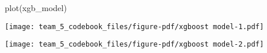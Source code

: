 \documentclass[
  letterpaper,
  DIV=11,
  numbers=noendperiod]{scrartcl}
\newenvironment{Shaded}{\begin{snugshade}}{\end{snugshade}}
\newcommand{\AttributeTok}[1]{\textcolor[rgb]{0.40,0.45,0.13}{#1}}
\newcommand{\CommentTok}[1]{\textcolor[rgb]{0.37,0.37,0.37}{#1}}
\newcommand{\FunctionTok}[1]{\textcolor[rgb]{0.28,0.35,0.67}{#1}}
\newcommand{\NormalTok}[1]{\textcolor[rgb]{0.00,0.23,0.31}{#1}}
\newcommand{\OtherTok}[1]{\textcolor[rgb]{0.00,0.23,0.31}{#1}}
\newcommand{\SpecialCharTok}[1]{\textcolor[rgb]{0.37,0.37,0.37}{#1}}
\begin{document}
\begin{Shaded}
\begin{Highlighting}[]
\FunctionTok{plot}\NormalTok{(xgb\_model)}
\end{Highlighting}
\end{Shaded}

\begin{center}
\texttt{[image: team\_5\_codebook\_files/figure-pdf/xgboost model-1.pdf]}
\end{center}

\begin{center}
\texttt{[image: team\_5\_codebook\_files/figure-pdf/xgboost model-2.pdf]}
\end{center}

\begin{Shaded}
\end{Shaded}
\end{document}
